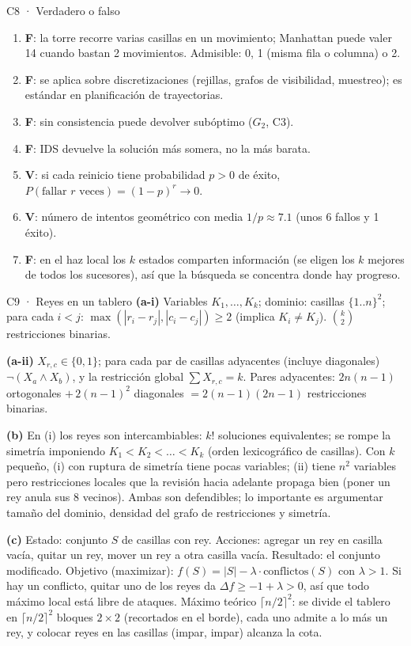 \begin{solucion}{C8 · Verdadero o falso}
\begin{enumerate}[label=(\alph*),nosep]
\item \textbf{F}: la torre recorre varias casillas en un movimiento; Manhattan puede valer 14 cuando
bastan 2 movimientos. Admisible: 0, 1 (misma fila o columna) o 2.
\item \textbf{F}: se aplica sobre discretizaciones (rejillas, grafos de visibilidad, muestreo); es estándar en planificación de trayectorias.
\item \textbf{F}: sin consistencia puede devolver subóptimo ($G_2$, C3).
\item \textbf{F}: IDS devuelve la solución más somera, no la más barata.
\item \textbf{V}: si cada reinicio tiene probabilidad $p>0$ de éxito, $P(\text{fallar } r \text{ veces})=(1-p)^r\to0$.
\item \textbf{V}: número de intentos geométrico con media $1/p\approx7.1$ (unos 6 fallos y 1 éxito).
\item \textbf{F}: en el haz local los $k$ estados comparten información (se eligen los $k$ mejores de todos los sucesores), así que la búsqueda se concentra donde hay progreso.
\end{enumerate}
\end{solucion}

\begin{solucion}{C9 · Reyes en un tablero}
\textbf{(a-i)} Variables $K_1,\dots,K_k$; dominio: casillas $\{1..n\}^2$; para cada $i<j$:
$\max(|r_i-r_j|,|c_i-c_j|)\ge2$ (implica $K_i\ne K_j$). $\binom{k}{2}$ restricciones binarias.

\textbf{(a-ii)} $X_{r,c}\in\{0,1\}$; para cada par de casillas adyacentes (incluye diagonales)
$\neg(X_a\wedge X_b)$, y la restricción global $\sum X_{r,c}=k$. Pares adyacentes:
$2n(n-1)$ ortogonales $+\,2(n-1)^2$ diagonales $=2(n-1)(2n-1)$ restricciones binarias.

\textbf{(b)} En (i) los reyes son intercambiables: $k!$ soluciones equivalentes; se rompe la simetría
imponiendo $K_1<K_2<\dots<K_k$ (orden lexicográfico de casillas). Con $k$ pequeño, (i) con ruptura de
simetría tiene pocas variables; (ii) tiene $n^2$ variables pero restricciones locales que la revisión
hacia adelante propaga bien (poner un rey anula sus 8 vecinos). Ambas son defendibles; lo importante es
argumentar tamaño del dominio, densidad del grafo de restricciones y simetría.

\textbf{(c)} Estado: conjunto $S$ de casillas con rey. Acciones: agregar un rey en casilla vacía,
quitar un rey, mover un rey a otra casilla vacía. Resultado: el conjunto modificado. Objetivo (maximizar):
$f(S)=|S|-\lambda\cdot\text{conflictos}(S)$ con $\lambda>1$. Si hay un conflicto, quitar uno de los reyes da
$\Delta f\ge-1+\lambda>0$, así que todo máximo local está libre de ataques. Máximo teórico
$\lceil n/2\rceil^2$: se divide el tablero en $\lceil n/2\rceil^2$ bloques $2\times2$ (recortados en el borde),
cada uno admite a lo más un rey, y colocar reyes en las casillas (impar, impar) alcanza la cota.
\end{solucion}

